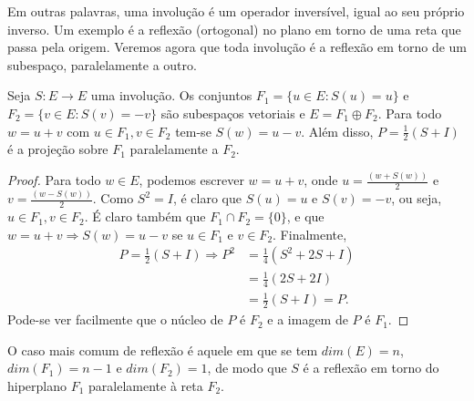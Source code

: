 Em outras palavras, uma involução é um operador inversível, igual ao seu próprio inverso. Um exemplo é a reflexão (ortogonal) no plano em torno de uma reta que passa pela origem. Veremos agora que toda involução é a reflexão em torno de um subespaço, paralelamente a outro.

\begin{teo}
  Seja $S:E\rightarrow E$ uma involução. Os conjuntos $F_1=\{u\in E: S(u)=u\}$ e $F_2=\{v\in E:S(v)=-v\}$ são subespaços vetoriais e $E=F_1\oplus F_2$. Para todo $w=u+v$ com $u\in F_1, v\in F_2$ tem-se $S(w)=u-v$. Além disso, $P=\frac{1}{2}(S+I)$ é a projeção sobre $F_1$ paralelamente a $F_2$.
\end{teo}

\begin{proof}
Para todo $w\in E$, podemos escrever $w=u+v$, onde $u=\frac{(w+S(w))}{2}$ e $v=\frac{(w-S(w))}{2}$. Como $S^2=I$, é claro que $S(u)=u$ e $S(v)=-v$, ou seja, $u\in F_1, v\in F_2$. É claro também que $F_1\cap F_2=\{0\}$, e que $w=u+v \Rightarrow S(w)=u-v$ se $u\in F_1$ e $v\in F_2$. Finalmente, 
\begin{align*}
   P=\frac{1}{2}(S+I)\Rightarrow P^2 &= \frac{1}{4}(S^2+2S+I)\\
   &= \frac{1}{4}(2S+2I)\\
   &= \frac{1}{2}(S+I)=P.
\end{align*}
Pode-se ver facilmente que o núcleo de $P$ é $F_2$ e a imagem de $P$ é $F_1$.
\end{proof}

O caso mais comum de reflexão é aquele em que se tem $dim(E)=n$, $dim(F_1)=n-1$ e $dim(F_2)=1$, de modo que $S$ é a reflexão em torno do hiperplano $F_1$ paralelamente à reta $F_2$.
